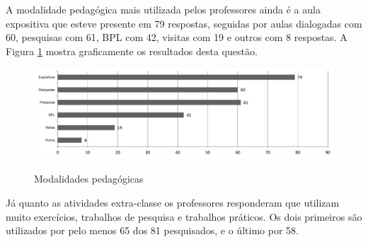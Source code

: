  



A modalidade pedagógica mais utilizada pelos professores ainda é a aula expositiva que esteve presente em 79 respostas, seguidas por aulas dialogadas com 60, pesquisas com 61, BPL com 42, visitas com 19 e outros com 8 respostas. A Figura \ref{fig:grafico_modalidade} mostra graficamente os resultados desta questão. 


 
\begin{figure}[!h]
\centering
\caption{Modalidades pedagógicas}
\includegraphics[width=1.0\textwidth]{pdfs/professores/img-grafico-modalidade.pdf} 
\label{fig:grafico_modalidade} 
\end{figure}


Já quanto as atividades extra-classe os professores responderam que utilizam muito exercícios, trabalhos de pesquisa e trabalhos práticos. Os dois primeiros são utilizados por pelo menos 65 dos 81 pesquisados, e o último por 58. 

